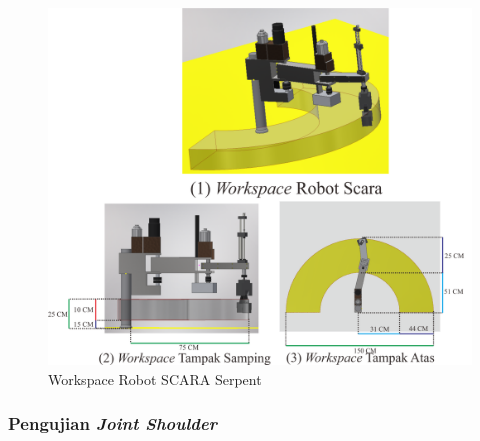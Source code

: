 \begin{figure}[H]
	\centering
	\includegraphics[width=13cm]{gambar/WORKSPACE.png}
	\caption{Workspace Robot SCARA Serpent}
	\label{pic.workpace}
\end{figure}

\fontsize{12}{15}\selectfont
\subsubsection{Pengujian \textit{Joint Shoulder}}

